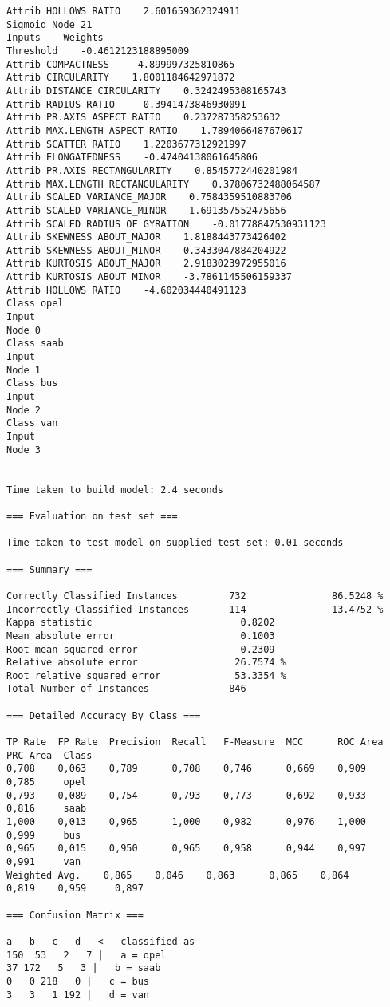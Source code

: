 \documentclass[
	article,			%
	11pt,				%
	oneside,			%
	a4paper,			%
	english,			%
	brazil,				%
	sumario=tradicional
	]{abntex2}
\begin{document}
\begin{lstlisting}
Attrib HOLLOWS RATIO    2.601659362324911
Sigmoid Node 21
Inputs    Weights
Threshold    -0.4612123188895009
Attrib COMPACTNESS    -4.899997325810865
Attrib CIRCULARITY    1.8001184642971872
Attrib DISTANCE CIRCULARITY    0.3242495308165743
Attrib RADIUS RATIO    -0.3941473846930091
Attrib PR.AXIS ASPECT RATIO    0.237287358253632
Attrib MAX.LENGTH ASPECT RATIO    1.7894066487670617
Attrib SCATTER RATIO    1.2203677312921997
Attrib ELONGATEDNESS    -0.47404138061645806
Attrib PR.AXIS RECTANGULARITY    0.8545772440201984
Attrib MAX.LENGTH RECTANGULARITY    0.37806732488064587
Attrib SCALED VARIANCE_MAJOR    0.7584359510883706
Attrib SCALED VARIANCE_MINOR    1.691357552475656
Attrib SCALED RADIUS OF GYRATION    -0.01778847530931123
Attrib SKEWNESS ABOUT_MAJOR    1.8188443773426402
Attrib SKEWNESS ABOUT_MINOR    0.3433047884204922
Attrib KURTOSIS ABOUT_MAJOR    2.9183023972955016
Attrib KURTOSIS ABOUT_MINOR    -3.7861145506159337
Attrib HOLLOWS RATIO    -4.602034440491123
Class opel
Input
Node 0
Class saab
Input
Node 1
Class bus
Input
Node 2
Class van
Input
Node 3


Time taken to build model: 2.4 seconds

=== Evaluation on test set ===

Time taken to test model on supplied test set: 0.01 seconds

=== Summary ===

Correctly Classified Instances         732               86.5248 %
Incorrectly Classified Instances       114               13.4752 %
Kappa statistic                          0.8202
Mean absolute error                      0.1003
Root mean squared error                  0.2309
Relative absolute error                 26.7574 %
Root relative squared error             53.3354 %
Total Number of Instances              846     

=== Detailed Accuracy By Class ===

TP Rate  FP Rate  Precision  Recall   F-Measure  MCC      ROC Area  PRC Area  Class
0,708    0,063    0,789      0,708    0,746      0,669    0,909     0,785     opel
0,793    0,089    0,754      0,793    0,773      0,692    0,933     0,816     saab
1,000    0,013    0,965      1,000    0,982      0,976    1,000     0,999     bus
0,965    0,015    0,950      0,965    0,958      0,944    0,997     0,991     van
Weighted Avg.    0,865    0,046    0,863      0,865    0,864      0,819    0,959     0,897     

=== Confusion Matrix ===

a   b   c   d   <-- classified as
150  53   2   7 |   a = opel
37 172   5   3 |   b = saab
0   0 218   0 |   c = bus
3   3   1 192 |   d = van


\end{lstlisting}
\end{document}
